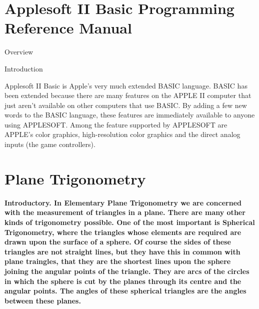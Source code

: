 \documentclass[a4paper,12pt]{article}
\begin{document}
\section{Applesoft II Basic Programming Reference Manual}
\begin{flushleft}
Overview\par
Introduction
\end{flushleft}
\begin{displayquote}
Applesoft II Basic is Apple's very much extended BASIC language. BASIC has been extended because there are many features on the APPLE II computer that just aren't available on other computers that use BASIC. By adding a few new words to the BASIC language, these features are immediately available to anyone using APPLESOFT. Among the feature supported by APPLESOFT are APPLE's color graphics, high-resolution color graphics and the direct analog inputs (the game controllers).
\end{displayquote}

\section{Plane Trigonometry}
\begin{displayquote}
\bf{Introductory.} In Elementary Plane Trigonometry we are
concerned with the measurement of triangles in a plane.
There are many other kinds of trigonometry possible. One of
the most important is Spherical Trigonometry, where the
triangles whose elements are required are drawn upon the
surface of a sphere. Of course the sides of these triangles
are not straight lines, but they have this in common with
plane traingles, that they are the shortest lines upon the
sphere joining the angular points of the triangle. They are
arcs of the circles in which the sphere is cut by the planes
through its centre and the angular points. The angles of
these spherical triangles are the angles between these
planes.
\end{displayquote}
\end{document}
